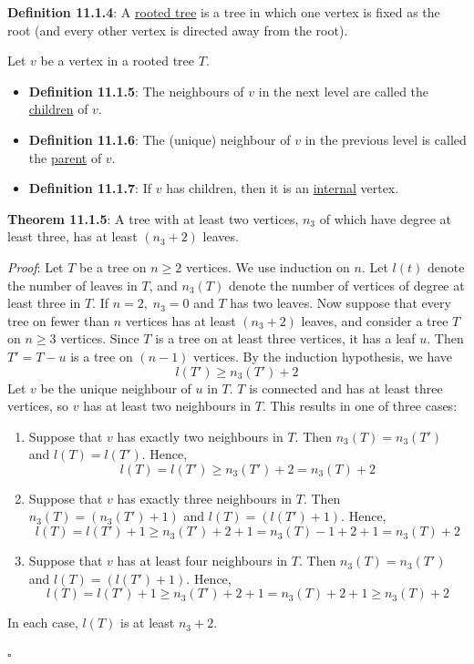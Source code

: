 \documentclass{article}
\newcommand{\separate}[1] {\vspace{#1 pt}\noindent}
\newcommand{\definition}[2]{\textbf{Definition #1}: #2\label{def:#1}}
\newcommand{\proof}[2]{\textit{Proof}: #2 \begin{flushright}\(\square\)\end{flushright}\label{prf:#1}}
\newcommand{\theorem}[3]{\textbf{Theorem #1}: #2 \par\separate{3}\proof{thm:#1}{#3}\label{thm:#1}}
\begin{document}
\separate{5}\definition{11.1.4}{A \underline{rooted tree} is a tree in which one vertex is fixed as the root (and every other vertex is directed away from the root).}

\separate{5}Let \(v\) be a vertex in a rooted tree \(T\).
\begin{itemize}
    \item \definition{11.1.5}{The neighbours of \(v\) in the next level are called the \underline{children} of \(v\).}
    \item \definition{11.1.6}{The (unique) neighbour of \(v\) in the previous level is called the \underline{parent} of \(v\).}
    \item \definition{11.1.7}{If \(v\) has children, then it is an \underline{internal} vertex.}
\end{itemize} 

\separate{5}\theorem{11.1.5}{A tree with at least two vertices, \(n_3\) of which have degree at least three, has at least \((n_3+2)\) leaves.}
{Let \(T\) be a tree on \(n \geq 2\) vertices. We use induction on \(n\). Let \(l(t)\) denote the number of leaves in \(T\), and \(n_3(T)\) denote the number of vertices of degree at least three in \(T\). If \(n=2, \; n_3=0\) and \(T\) has two leaves.
Now suppose that every tree on fewer than \(n\) vertices has at least \((n_3+2)\) leaves, and consider a tree \(T\) on \(n \geq 3\) vertices. Since \(T\) is a tree on at least three vertices, it has a leaf \(u\). Then \(T'=T-u\) is a tree on \((n-1)\) vertices. By the induction hypothesis, we have 
\begin{equation}l(T') \geq n_3(T') + 2\end{equation}
\newpage\noindent Let \(v\) be the unique neighbour of \(u\) in \(T\). \(T\) is connected and has at least three vertices, so \(v\) has at least two neighbours in \(T\). This results in one of three cases:
\begin{enumerate}
    \item Suppose that \(v\) has exactly two neighbours in \(T\). Then \(n_3(T)=n_3(T')\) and \(l(T)=l(T')\). Hence,
    \begin{equation}
        l(T) = l(T') \geq n_3(T') + 2 = n_3(T) + 2
    \end{equation}
    \item Suppose that \(v\) has exactly three neighbours in \(T\). Then \(n_3(T) = (n_3(T') + 1)\) and \(l(T) = (l(T') + 1)\). Hence,
    \begin{equation}
        l(T) = l(T') + 1 \geq n_3(T') + 2 + 1 = n_3(T) - 1 + 2 + 1 = n_3(T) + 2
    \end{equation}
    \item Suppose that \(v\) has at least four neighbours in \(T\). Then \(n_3(T) = n_3(T')\) and \(l(T) = (l(T') + 1)\). Hence,
    \begin{equation}
        l(T) = l(T') + 1 \geq n_3(T') + 2 + 1 = n_3(T) + 2 + 1 \geq n_3(T) + 2
    \end{equation}
\end{enumerate}
In each case, \(l(T)\) is at least \(n_3+2\).}
\end{document}
